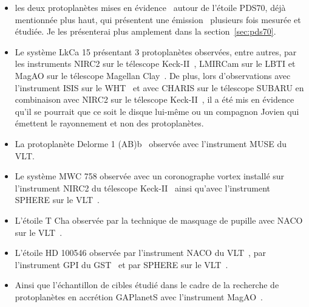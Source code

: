\begin{itemize}
    \item les deux protoplanètes mises en évidence~\citep{keppler2018, muller2018} autour de l'étoile PDS70, déjà mentionnée plus haut, qui présentent une émission \ha~plusieurs fois mesurée et étudiée. Je les présenterai plus amplement dans la section~\ref{sec:pds70}.
    
    \item Le système LkCa 15 présentant 3 protoplanètes observées, entre autres, par les instruments \ac{NIRC2} sur le télescope Keck-II~\citep{kraus2012}, \ac{LMIRCam} sur le \ac{LBTI} et \ac{MagAO} sur le télescope Magellan Clay~\citep{sallum2015}. De plus, lors d'observations avec l'instrument \ac{ISIS} sur le \ac{WHT}~\citep{mendigutia2018} et avec \ac{CHARIS} sur le télescope SUBARU en combinaison avec \ac{NIRC2} sur le télescope Keck-II~\citep{currie2019}, il a été mis en évidence qu'il se pourrait que ce soit le disque lui-même ou un compagnon Jovien qui émettent le rayonnement \ha et non des protoplanètes.
    
    \item La protoplanète Delorme 1 (AB)b~\citep{eriksson2020, ringqvist2021} observée avec l'instrument \ac{MUSE} du \ac{VLT}.
    
    \item Le système MWC 758 observée avec un coronographe vortex installé sur l'instrument \ac{NIRC2} du télescope Keck-II~\citep{reggiani2018} ainsi qu'avec l'instrument \ac{SPHERE} sur le \ac{VLT}~\citep{cugno2019}.
    
    \item L'étoile T Cha observée par la technique de masquage de pupille avec \ac{NACO} sur le \ac{VLT}~\citep{huelamo2011}.
    
    \item L'étoile HD 100546 observée par l'instrument \ac{NACO} du \ac{VLT}~\citep{quanz2013, quanz2015}, par l'instrument \ac{GPI} du \ac{GST}~\citep{currie2015, follette2017} et par \ac{SPHERE} sur le \ac{VLT}~\citep{mendigutia2017}.%
    
    \item Ainsi que l'échantillon de cibles étudié dans le cadre de la recherche de protoplanètes en accrétion \ac{GAPlanetS} avec l'instrument \ac{MagAO}~\citep{follette2022}.
\end{itemize}

